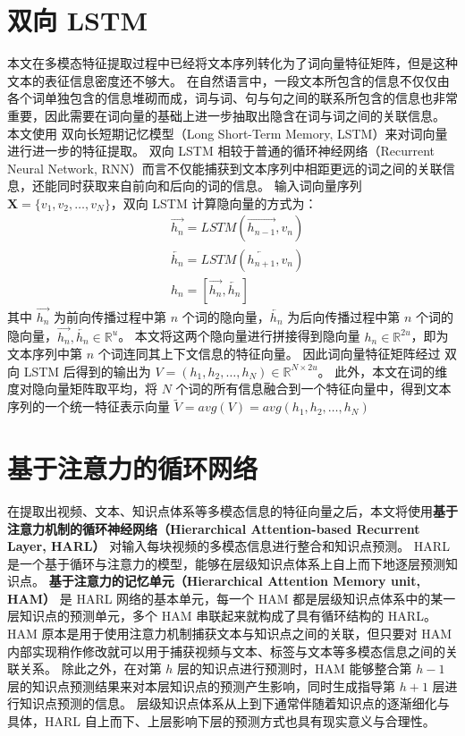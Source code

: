 \section{双向 LSTM}
    本文在多模态特征提取过程中已经将文本序列转化为了词向量特征矩阵，但是这种文本的表征信息密度还不够大。
    在自然语言中，一段文本所包含的信息不仅仅由各个词单独包含的信息堆砌而成，词与词、句与句之间的联系所包含的信息也非常重要，因此需要在词向量的基础上进一步抽取出隐含在词与词之间的关联信息。
    本文使用 双向长短期记忆模型（Long Short-Term Memory, LSTM）\cite{Hochreiter1997LongSM}来对词向量进行进一步的特征提取。
    双向 LSTM 相较于普通的循环神经网络（Recurrent Neural Network, RNN）而言不仅能捕获到文本序列中相距更远的词之间的关联信息，还能同时获取来自前向和后向的词的信息。
    输入词向量序列 $\boldsymbol{X} = \{v_1, v_2, \dots, v_N\}$，双向 LSTM 计算隐向量的方式为：
    \begin{equation}
        \begin{aligned}
            &\overrightarrow{h_{n}} = LSTM\left(\overrightarrow{h_{n - 1}}, v_n\right) \\
            &\overleftarrow{h_{n}} = LSTM\left(\overleftarrow{h_{n + 1}}, v_n\right) \\
            &h_n = \left[\overrightarrow{h_n}, \overleftarrow{h_n}\right]
        \end{aligned}
    \end{equation}
    其中 $\overrightarrow{h_{n}}$ 为前向传播过程中第 $n$ 个词的隐向量，$\overleftarrow{h_{n}}$ 为后向传播过程中第 $n$ 个词的隐向量，$\overrightarrow{h_{n}}, \overleftarrow{h_{n}} \in \mathbb{R}^{u}$。
    本文将这两个隐向量进行拼接得到隐向量 $h_n \in \mathbb{R}^{2u}$，即为文本序列中第 $n$ 个词连同其上下文信息的特征向量。
    因此词向量特征矩阵经过 双向 LSTM 后得到的输出为 $V = \left(h_1, h_2, \dots, h_N\right) \in \mathbb{R}^{N \times 2u}$。
    此外，本文在词的维度对隐向量矩阵取平均，将 $N$ 个词的所有信息融合到一个特征向量中，得到文本序列的一个统一特征表示向量 $\tilde{V} = avg\left(V\right) = avg\left(h_1, h_2, \dots, h_N\right)$


\section{基于注意力的循环网络}
    在提取出视频、文本、知识点体系等多模态信息的特征向量之后，本文将使用\textbf{基于注意力机制的循环神经网络（Hierarchical Attention-based Recurrent Layer, HARL）}\cite{Huang2019HierarchicalMT} 对输入每块视频的多模态信息进行整合和知识点预测。
    HARL 是一个基于循环与注意力的模型，能够在层级知识点体系上自上而下地逐层预测知识点。
    \textbf{基于注意力的记忆单元（Hierarchical Attention Memory unit, HAM）} 是 HARL 网络的基本单元，每一个 HAM 都是层级知识点体系中的某一层知识点的预测单元，多个 HAM 串联起来就构成了具有循环结构的 HARL。
    HAM 原本是用于使用注意力机制捕获文本与知识点之间的关联，但只要对 HAM 内部实现稍作修改就可以用于捕获视频与文本、标签与文本等多模态信息之间的关联关系。
    除此之外，在对第 $h$ 层的知识点进行预测时，HAM 能够整合第 $h - 1$ 层的知识点预测结果来对本层知识点的预测产生影响，同时生成指导第 $h + 1$ 层进行知识点预测的信息。
    层级知识点体系从上到下通常伴随着知识点的逐渐细化与具体，HARL 自上而下、上层影响下层的预测方式也具有现实意义与合理性。

